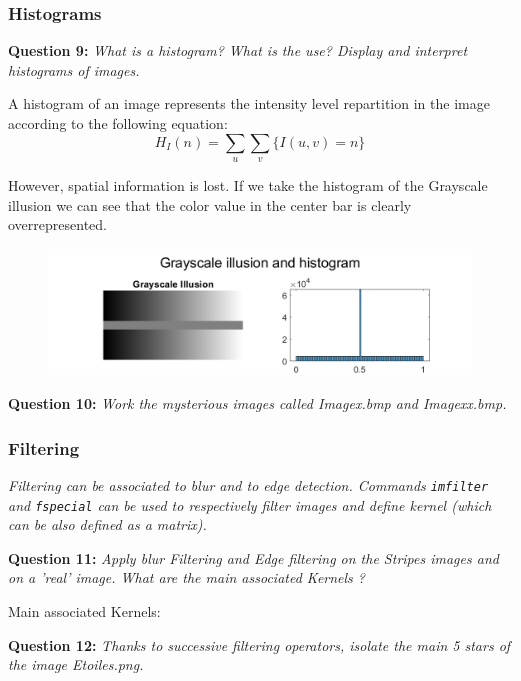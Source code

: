 \subsubsection{Histograms}
\textbf{Question 9:}
\textit{What is a histogram? What is the use? Display and interpret histograms of images.}

A histogram of an image represents the intensity level repartition in the image according to the following equation:
\[H_I(n) = \sum_{u} \sum_{v} \{ I(u, v) = n \}\]

However, spatial information is lost. 
If we take the histogram of the Grayscale illusion we can see that the color value in the center bar is clearly overrepresented.

\begin{figure}[h]
    \centering
    \includegraphics[width=0.75\linewidth]{Doc/Graphics/Part1/part1_Q9.png}
\end{figure}


\textbf{Question 10:}
\textit{Work the mysterious images called Imagex.bmp and Imagexx.bmp.}






\subsubsection{Filtering}
\textit{Filtering can be associated to blur and to edge detection. Commands \texttt{imfilter} and \texttt{fspecial} can be used to respectively ﬁlter images and deﬁne kernel (which can be also deﬁned as a matrix).}


\textbf{Question 11:}
\textit{Apply blur Filtering and Edge ﬁltering on the Stripes images and on a ’real’ image. What are the main associated Kernels ?}



Main associated Kernels:
\TODO{}



\textbf{Question 12:}
\textit{Thanks to successive ﬁltering operators, isolate the main 5 stars of the image Etoiles.png.}

